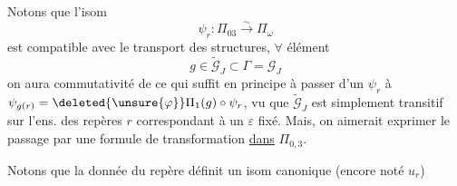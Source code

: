 Notons que l'isom
\[
\psi_r:\Pi_{03}\xrightarrow{\sim}\Pi_\omega
\]
est compatible avec le transport des structures,   $\forall$ élément
\[
g\in\widetilde{\mathcal G}_J\subset\Gamma=\mathcal G_J
\]
\inserted{
\[
\begin{aligned}
\widetilde{\mathcal G}_J=\Gamma_{P_\varepsilon}&=\left\{(g,\tau^{\unsure{\operatorname{sg}g|\alpha}})\in\mathcal G_J\times\deleted{\{1,\tau\}}\inserted{\mathbb Z/2\mathbb Z}\ \middle|\ \begin{array}{l}\alpha=0\text{ si }\operatorname{sg}g=1\\\alpha=1\text{ si }\operatorname{sg}g=-1\end{array}\right\}\\
&=\{g\in\Gamma\mid \unsure{g_\varepsilon^{(\varepsilon)}|g(\varepsilon)}=\operatorname{id}_{\unsure{\varepsilon}}\}
\end{aligned}
\]
}
on aura commutativité de
ce qui suffit en principe à passer d'un $\psi_r$ à $\psi_{g(r)}=\deleted{\unsure{\varphi}}\Pi_1(g)\circ\psi_r$, vu que  $\widetilde{\mathcal G}_J$ est simplement transitif sur l'ens. des repères $r$ correspondant à un $\varepsilon$ fixé. Mais, on aimerait exprimer le passage par une formule de transformation \uline{dans} $\Pi_{0,3}$.

Notons que la donnée du repère  définit un isom canonique (encore noté $u_r$)
